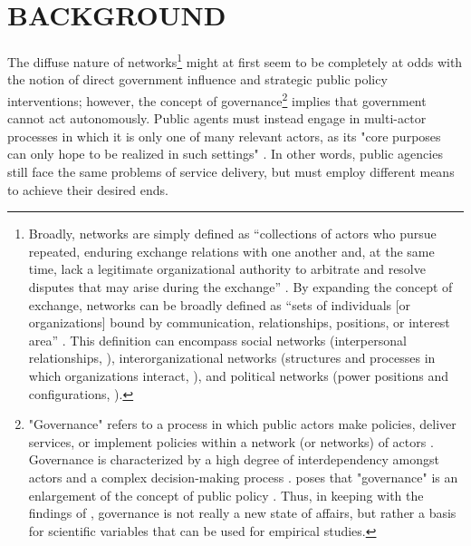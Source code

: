 \documentclass[12pt,a4paper,titlepage]{article}
\begin{document}
\section{\bf\MakeUppercase{Background}}

The diffuse nature of networks\footnote{Broadly, networks are simply defined as “collections of actors who pursue repeated, enduring exchange relations with one another and, at the same time, lack a legitimate organizational authority to arbitrate and resolve disputes that may arise during the exchange” \parencite[59]{podolny1998}. By expanding the concept of exchange, networks can be broadly defined as “sets of individuals [or organizations] bound by communication, relationships, positions, or interest area” \parencite[33]{margerum2011}. This definition can encompass social networks (interpersonal relationships, \cite{putnam2000}), interorganizational networks (structures and processes in which organizations interact, \cite{alexander1993}), and political networks (power positions and configurations, \cite{knoke1990}).} might at first seem to be completely at odds with the notion of direct government influence and strategic public policy interventions; however, the concept of governance\footnote{"Governance" refers to a process in which public actors make policies, deliver services, or implement policies within a network (or networks) of actors \parencite{frederickson2005,rhodes1997,torfing2007}. Governance is characterized by a high degree of interdependency amongst actors and a complex decision-making process \parencite{klijn2010}. \textcite[125]{bressers2009} poses that "governance" is an enlargement of the concept of public policy \parencite[also][]{bressers2003}. Thus, in keeping with the findings of \textcite{ostrom1961}, governance is not really a new state of affairs, but rather a basis for scientific variables that can be used for empirical studies.} implies that government cannot act autonomously. Public agents must instead engage in multi-actor processes in which it is only one of many relevant actors, as its "core purposes can only hope to be realized in such settings" \parencite[130]{bressers2009}. In other words, public agencies still face the same problems of service delivery, but must employ different means to achieve their desired ends.
\end{document}
